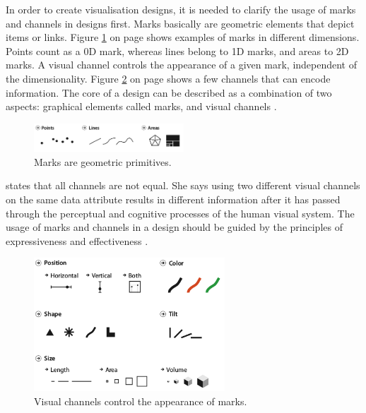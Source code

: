 In order to create visualisation designs, it is needed to clarify the usage of marks and channels in designs first. Marks basically are geometric elements that depict items or links. Figure \ref{fig:va-marks} on page \pageref{fig:va-marks} shows examples of marks in different dimensions. Points count as a 0D mark, whereas lines belong to 1D marks, and areas to 2D marks. A visual channel controls the appearance of a given mark, independent of the dimensionality. Figure \ref{fig:va-channels} on page \pageref{fig:va-channels} shows a few channels that can encode information. The core of a design can be described as a combination of two aspects: graphical elements called marks, and visual channels .

\begin{figure}[!htb]
\centering
\includegraphics[width=0.5\textwidth,keepaspectratio]{images/va/marks.png}
\caption[
    Marks are geometric primitives .
]{Marks are geometric primitives.}
\label{fig:va-marks}
\end{figure}

\citeauthor{Munzner2014} states that all channels are not equal. She says using two different visual channels on the same data attribute results in different information after it has passed through the perceptual and cognitive processes of the human visual system. The usage of marks and channels in a design should be guided by the principles of expressiveness and effectiveness .

\begin{figure}[!htb]
\centering
\includegraphics[height=5cm,keepaspectratio]{images/va/channels.png}
\caption[
    Visual channels control the appearance of marks .
]{Visual channels control the appearance of marks.}
\label{fig:va-channels}
\end{figure}

